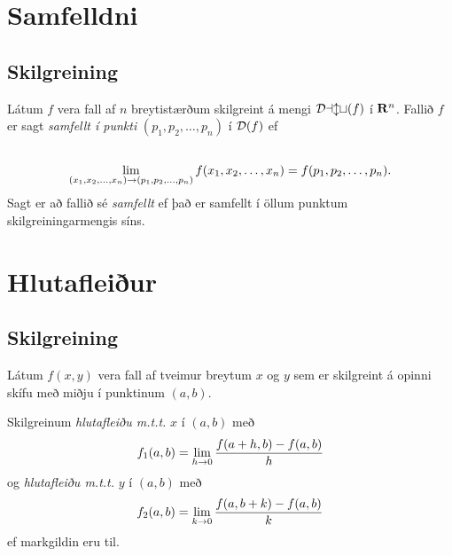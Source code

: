 \documentclass[a4paper,10pt,icelandic]{sphinxmanual}
\begin{document}
\section{Samfelldni}
\label{Kafli2:samfelldni}\label{Kafli2:index-8}

\subsection{Skilgreining}
\label{Kafli2:id8}
Látum \(f\) vera fall af \(n\) breytistærðum skilgreint á mengi
\({\cal Dalt}(f)\) í \(\mbox{${\bf R}^n$}\). Fallið \(f\) er
sagt \emph{samfellt í punkti} \((p_1,p_2,\ldots,p_n)\) í
\({\cal D}(f)\) ef
\begin{gather}
\begin{split}\displaystyle\end{split}\notag\\\begin{split}\lim_{(x_1,x_2,\ldots,x_n)\rightarrow (p_1,p_2,\ldots,p_n)}
f(x_1,x_2,\ldots,x_n)=f(p_1,p_2,\ldots,p_n).\end{split}\notag
\end{gather}
Sagt er að fallið sé \emph{samfellt} ef það er samfellt í öllum punktum
skilgreiningarmengis síns.


\section{Hlutafleiður}
\label{Kafli2:id9}

\subsection{Skilgreining}
\label{Kafli2:index-9}\label{Kafli2:id10}
Látum \(f(x,y)\) vera fall af tveimur breytum \(x\) og \(y\)
sem er skilgreint á opinni skífu með miðju í punktinum \((a,b)\).

Skilgreinum \emph{hlutafleiðu m.t.t.} \(x\) í \((a,b)\) með
\begin{gather}
\begin{split}\displaystyle f_1(a,b)=\lim_{h\rightarrow 0}\frac{f(a+h,b)-f(a,b)}{h}\end{split}\notag
\end{gather}
og \emph{hlutafleiðu m.t.t.} \(y\) í \((a,b)\) með
\begin{gather}
\begin{split}\displaystyle f_2(a,b)=\lim_{k\rightarrow 0}\frac{f(a,b+k)-f(a,b)}{k}\end{split}\notag
\end{gather}
ef markgildin eru til.
\end{document}
